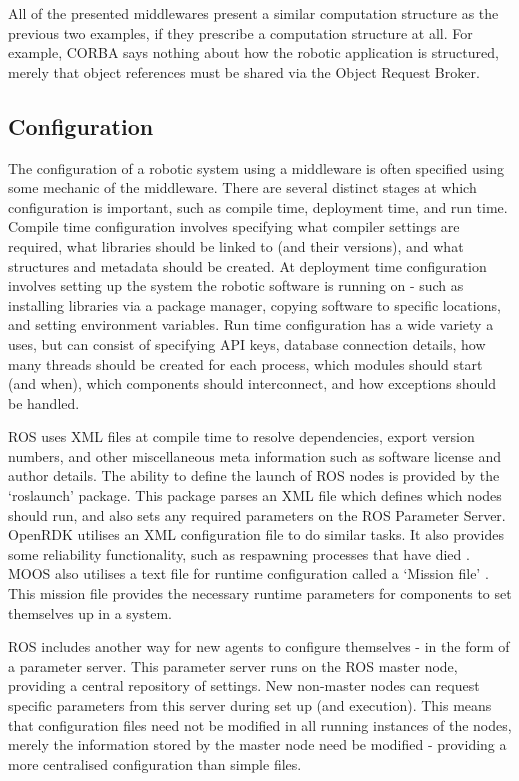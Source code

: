 \documentclass[../dissertation.tex]{subfiles}
\begin{document}
All of the presented middlewares present a similar computation structure as the previous two examples, if they prescribe a computation structure at all. For example, CORBA says nothing about how the robotic application is structured, merely that object references must be shared via the Object Request Broker.

\subsection{Configuration}

The configuration of a robotic system using a middleware is often specified using some mechanic of the middleware. There are several distinct stages at which configuration is important, such as compile time, deployment time, and run time. Compile time configuration involves specifying what compiler settings are required, what libraries should be linked to (and their versions), and what structures and metadata should be created. At deployment time configuration involves setting up the system the robotic software is running on - such as installing libraries via a package manager, copying software to specific locations, and setting environment variables. Run time configuration has a wide variety a uses, but can consist of specifying API keys, database connection details, how many threads should be created for each process, which modules should start (and when), which components should interconnect, and how exceptions should be handled.

ROS uses XML files at compile time to resolve dependencies, export version numbers, and other miscellaneous meta information such as software license and author details. The ability to define the launch of ROS nodes is provided by the `roslaunch' package. This package parses an XML file which defines which nodes should run, and also sets any required parameters on the ROS Parameter Server. OpenRDK utilises an XML configuration file to do similar tasks. It also provides some reliability functionality, such as respawning processes that have died \cite{roslaunchPage}. MOOS also utilises a text file for runtime configuration called a `Mission file' \cite{newman2009introduction}. This mission file provides the necessary runtime parameters for components to set themselves up in a system.

ROS includes another way for new agents to configure themselves - in the form of a parameter server. This parameter server runs on the ROS master node, providing a central repository of settings. New non-master nodes can request specific parameters from this server during set up (and execution). This means that configuration files need not be modified in all running instances of the nodes, merely the information stored by the master node need be modified - providing a more centralised configuration than simple files.
\end{document}
